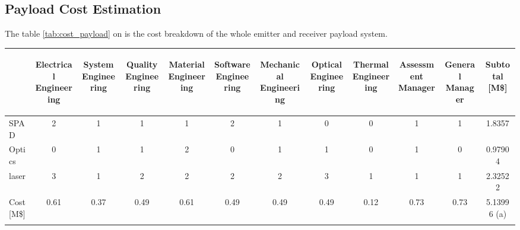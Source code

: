 \subsection{Payload Cost Estimation}
\label{cost}
The table \ref{tab:cost_payload} on \pageref{tab:cost_payload} is the cost breakdown of the whole emitter and receiver payload system. 

\begin{table}[ht!]
\centering
\begin{tabular}{p{0.7in}|cccccccccc||c}
&\begin{sideways}Electrical Engineering\end{sideways} 
&\begin{sideways}System Engineering\end {sideways} 
&\begin{sideways}Quality Engineering\end{sideways} 
&\begin{sideways}Material Engineering\end{sideways} 
&\begin{sideways}Software Engineering\end{sideways} 
&\begin{sideways}Mechanical Engineering\end{sideways} 
&\begin{sideways}Optical Engineering\end{sideways} 
&\begin{sideways}Thermal Engineering\end{sideways}
&\begin{sideways}Assessment Manager\end{sideways}
&\begin{sideways}General Manager\end{sideways}
&\begin{sideways}Subtotal [M\$]\end{sideways}\\\hline
\acs{SPAD} &2 &1 &1 &1 &2 &1 &0 &0 &1 &1 &1.8357 \\
Optics &0 &1 &1 &2 &0 &1 &1 &0 &1 &0 &0.97904 \\
\acs{laser} &3 &1 &2 &2 &2 &2 &3 &1 &1 &1 &2.32522 \\ \hline \hline 
Cost [M\$] &0.61 &0.37 &0.49 &0.61 &0.49 &0.49 &0.49 &0.12 &0.73 &0.73 &5.13996 (a) \\\hline\\


\end{tabular}
\end{table}
